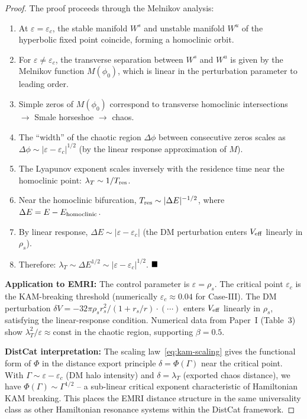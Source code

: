 \documentclass[
]{article}
\begin{document}
\begin{proof}
The proof proceeds through the Melnikov analysis:
\begin{enumerate}
\item At $\varepsilon = \varepsilon_c$, the stable manifold $W^s$ and unstable manifold $W^u$ of the hyperbolic fixed point coincide, forming a homoclinic orbit.
\item For $\varepsilon \neq \varepsilon_c$, the transverse separation between $W^s$ and $W^u$ is given by the Melnikov function $M(\phi_0)$, which is linear in the perturbation parameter to leading order.
\item Simple zeros of $M(\phi_0)$ correspond to transverse homoclinic intersections $\to$ Smale horseshoe $\to$ chaos.
\item The ``width'' of the chaotic region $\Delta\phi$ between consecutive zeros scales as $\Delta\phi \sim |\varepsilon - \varepsilon_c|^{1/2}$ (by the linear response approximation of $M$).
\item The Lyapunov exponent scales inversely with the residence time near the homoclinic point: $\lambda_T \sim 1/T_{\rm res}$.
\item Near the homoclinic bifurcation, $T_{\rm res} \sim |\Delta E|^{-1/2}$, where $\Delta E = E - E_{\rm homoclinic}$.
\item By linear response, $\Delta E \sim |\varepsilon - \varepsilon_c|$ (the DM perturbation enters $V_{\rm eff}$ linearly in $\rho_s$).
\item Therefore: $\lambda_T \sim \Delta E^{1/2} \sim |\varepsilon - \varepsilon_c|^{1/2}$. $\hfill\blacksquare$
\end{enumerate}

\textbf{Application to EMRI:} The control parameter is $\varepsilon = \rho_s$. The critical point $\varepsilon_c$ is the KAM-breaking threshold (numerically $\varepsilon_c \approx 0.04$ for Case-III). The DM perturbation $\delta V = -32\pi\rho_s r_s^2/(1+r_s/r) \cdot (\cdots)$ enters $V_{\rm eff}$ linearly in $\rho_s$, satisfying the linear-response condition. Numerical data from Paper~I (Table~3) show $\lambda_T^2/\varepsilon \approx \text{const}$ in the chaotic region, supporting $\beta = 0.5$.

\textbf{DistCat interpretation:} The scaling law~\eqref{eq:kam-scaling} gives the functional form of $\Phi$ in the distance export principle $\delta = \Phi(\Gamma)$ near the critical point. With $\Gamma \sim \varepsilon - \varepsilon_c$ (DM halo intensity) and $\delta = \lambda_T$ (exported chaos distance), we have $\Phi(\Gamma) \sim \Gamma^{1/2}$ -- a sub-linear critical exponent characteristic of Hamiltonian KAM breaking. This places the EMRI distance structure in the same universality class as other Hamiltonian resonance systems within the DistCat framework.
\end{proof}
\end{document}
